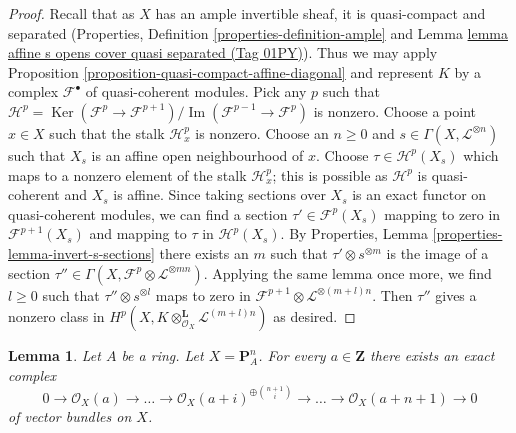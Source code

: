 \documentclass{amsart}
\theoremstyle{plain}
\newtheorem{lemma}[subsection]{Lemma}
\theoremstyle{definition}
\theoremstyle{remark}
\numberwithin{equation}{subsection}
\def\Ker{\mathop{\mathrm{Ker}}}
\def\Im{\mathop{\mathrm{Im}}}
\begin{document}
\begin{proof}
Recall that as $X$ has an ample invertible sheaf, it is quasi-compact
and separated (Properties, Definition \ref{properties-definition-ample} and
Lemma \href{https://stacks.math.columbia.edu/tag/01PY}{lemma affine s opens cover quasi separated (Tag 01PY)}).
Thus we may apply
Proposition \ref{proposition-quasi-compact-affine-diagonal}
and represent $K$ by a complex $\mathcal{F}^\bullet$ of
quasi-coherent modules. Pick any $p$ such that
$\mathcal{H}^p = \Ker(\mathcal{F}^p \to \mathcal{F}^{p + 1})/
\Im(\mathcal{F}^{p - 1} \to \mathcal{F}^p)$ is nonzero.
Choose a point $x \in X$ such that the stalk $\mathcal{H}^p_x$ is
nonzero. Choose an $n \geq 0$ and $s \in \Gamma(X, \mathcal{L}^{\otimes n})$
such that $X_s$ is an affine open neighbourhood of $x$.
Choose $\tau \in \mathcal{H}^p(X_s)$ which maps to a nonzero
element of the stalk $\mathcal{H}^p_x$; this is possible
as $\mathcal{H}^p$ is quasi-coherent and $X_s$ is affine.
Since taking sections over $X_s$ is an exact functor on
quasi-coherent modules, we can find a section $\tau' \in \mathcal{F}^p(X_s)$
mapping to zero in $\mathcal{F}^{p + 1}(X_s)$ and mapping to
$\tau$ in $\mathcal{H}^p(X_s)$. By
Properties, Lemma \ref{properties-lemma-invert-s-sections}
there exists an $m$ such that $\tau' \otimes s^{\otimes m}$
is the image of a section
$\tau'' \in \Gamma(X, \mathcal{F}^p \otimes \mathcal{L}^{\otimes mn})$.
Applying the same lemma once more, we find $l \geq 0$ such that
$\tau'' \otimes s^{\otimes l}$ maps to zero in
$\mathcal{F}^{p + 1} \otimes \mathcal{L}^{\otimes (m + l)n}$.
Then $\tau''$ gives a nonzero class in
$H^p(X, K \otimes^\mathbf{L}_{\mathcal{O}_X} \mathcal{L}^{(m + l)n})$
as desired.
\end{proof}


\begin{lemma}
\label{lemma-construct-the-next-one}
Let $A$ be a ring. Let $X = \mathbf{P}^n_A$. For every $a \in \mathbf{Z}$
there exists an exact complex
$$
0 \to \mathcal{O}_X(a) \to \ldots
\to \mathcal{O}_X(a + i)^{\oplus {n + 1 \choose i}} \to
\ldots \to \mathcal{O}_X(a + n + 1) \to 0
$$
of vector bundles on $X$.
\end{lemma}
\end{document}

